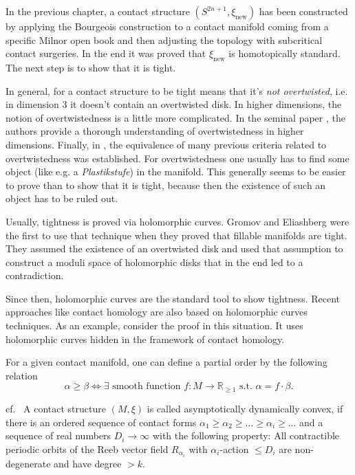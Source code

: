 In the previous chapter, a contact structure $(S^{2n+1}, \xi_\text{new})$ has been constructed by applying the Bourgeois construction
to a contact manifold coming from a specific Milnor open book and then adjusting the topology with subcritical contact surgeries.
In the end it was proved that $\xi_\text{new}$ is homotopically standard.
The next step is to show that it is tight. 

In general, for a contact structure to be tight means that it's \textit{not overtwisted}, i.e. in dimension 3 it doesn't contain an overtwisted disk.
In higher dimensions, the notion of overtwistedness is a little more complicated. 
In the seminal paper \cite{BEM15}, the authors provide a thorough understanding of overtwistedness in higher dimensions.
Finally, in \cite{CMP19}, the equivalence of many previous criteria related to overtwistedness was established.
For overtwistedness one usually has to find some object (like e.g. a \textit{Plastikstufe}) in the manifold.
This generally seems to be easier to prove than to show that it is tight, because then the existence of such an object has to be ruled out.

Usually, tightness is proved via holomorphic curves. Gromov and Eliashberg were the first to use that technique \cite{Gromov85,Eliashberg91}
when they proved that fillable manifolds are tight. They assumed the existence of an overtwisted disk and used that assumption to construct
a moduli space of holomorphic disks that in the end led to a contradiction.

Since then, holomorphic curves are the standard tool to show tightness.
Recent approaches like contact homology are also based on holomorphic curves techniques.
As an example, consider the proof in this situation. It uses holomorphic curves hidden in the framework of contact homology.

For a given contact manifold, one can define a partial order by the following relation
\[
    \alpha \geq \beta \Leftrightarrow \exists \text{ smooth function } f: M \to \mathbb R_{\geq 1} \text{ s.t. } \alpha = f \cdot \beta.
\]
\begin{definition}[k-ADC]cf.~\cite{Zhou21b,Lazarev20}
    A contact structure $(M, \xi)$ is called asymptotically dynamically convex, if there is an ordered sequence of contact forms 
    $\alpha_1 \geq \alpha_2 \geq \dots \geq \alpha_i \geq \dots$ and a sequence of real numbers $D_i \to \infty$
    with the following property:
    All contractible periodic orbits of the Reeb vector field $R_{\alpha_i}$ with $\alpha_i$-action $\leq D_i$ are non-degenerate
    and have degree $> k$.
\end{definition}

